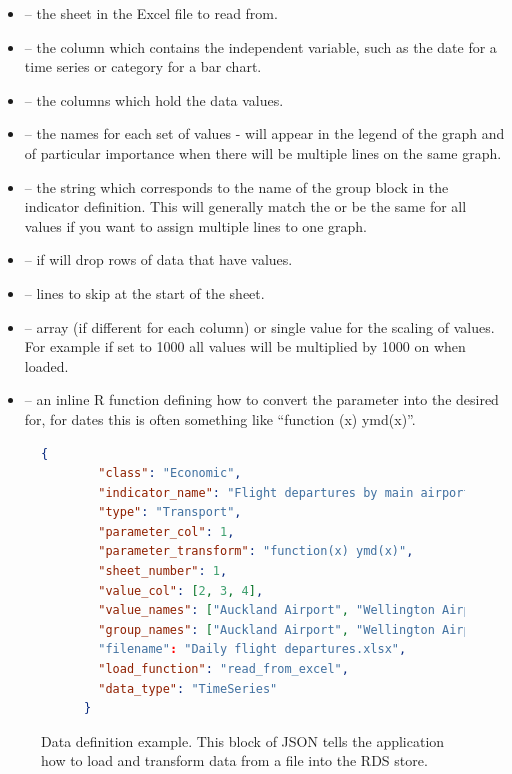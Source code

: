 \documentclass[12pt]{article}
\begin{document}
\begin{itemize}
\item {} -- the sheet in the Excel file to read from.
\item {} -- the column which contains the independent variable, such as the date for a time series or category for a bar chart.
\item {} -- the columns which hold the data values.
\item {} -- the names for each set of values - will appear in the legend of the graph and of particular importance when there will be multiple lines on the same graph.
\item {} -- the string which corresponds to the name of the group block in the indicator definition.  This will generally match the  or be the same for all values if you want to assign multiple lines to one graph.
\item {} -- if  will drop rows of data that have  values.
\item {} -- lines to skip at the start of the sheet.
\item {} -- array (if different for each column) or single value for the scaling of values.  For example if set to 1000 all values will be multiplied by 1000 on when loaded.
\item {} -- an inline R function defining how to convert the parameter into the desired for, for dates this is often something like ``function (x) ymd(x)''.
\end{itemize}

\begin{figure}
\footnotesize
\begin{lstlisting}[language=json,firstnumber=1]
      {
        "class": "Economic",
        "indicator_name": "Flight departures by main airports",
        "type": "Transport",
        "parameter_col": 1,
        "parameter_transform": "function(x) ymd(x)",
        "sheet_number": 1,
        "value_col": [2, 3, 4],
        "value_names": ["Auckland Airport", "Wellington Airport"],
        "group_names": ["Auckland Airport", "Wellington Airport"]
        "filename": "Daily flight departures.xlsx",
        "load_function": "read_from_excel",
        "data_type": "TimeSeries"
      }
\end{lstlisting}
\caption{Data definition example.  This block of JSON tells the application how to load and transform data from a file into the RDS store.}\label{fig:data_definition}
\end{figure}
\end{document}
